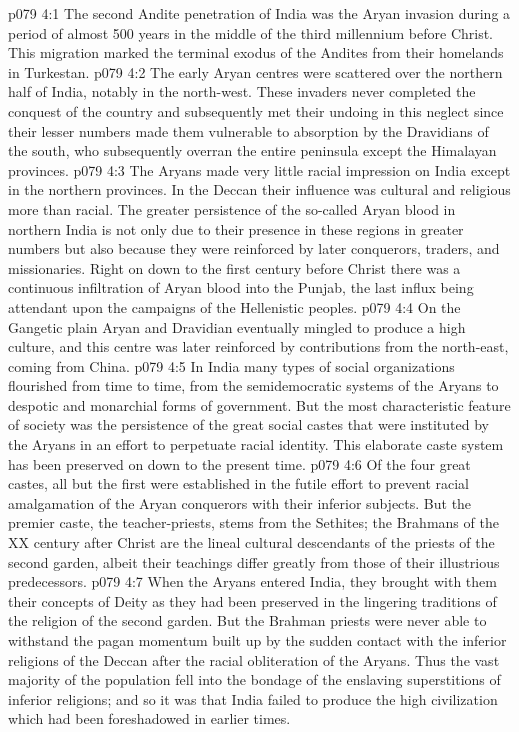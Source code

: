 \vs p079 4:1 The second Andite penetration of India was the Aryan invasion during a period of almost 500 years in the middle of the third millennium before Christ. This migration marked the terminal exodus of the Andites from their homelands in Turkestan.
\vs p079 4:2 The early Aryan centres were scattered over the northern half of India, notably in the north\hyp{}west. These invaders never completed the conquest of the country and subsequently met their undoing in this neglect since their lesser numbers made them vulnerable to absorption by the Dravidians of the south, who subsequently overran the entire peninsula except the Himalayan provinces.
\vs p079 4:3 The Aryans made very little racial impression on India except in the northern provinces. In the Deccan their influence was cultural and religious more than racial. The greater persistence of the so\hyp{}called Aryan blood in northern India is not only due to their presence in these regions in greater numbers but also because they were reinforced by later conquerors, traders, and missionaries. Right on down to the first century before Christ there was a continuous infiltration of Aryan blood into the Punjab, the last influx being attendant upon the campaigns of the Hellenistic peoples.
\vs p079 4:4 On the Gangetic plain Aryan and Dravidian eventually mingled to produce a high culture, and this centre was later reinforced by contributions from the north\hyp{}east, coming from China.
\vs p079 4:5 In India many types of social organizations flourished from time to time, from the semidemocratic systems of the Aryans to despotic and monarchial forms of government. But the most characteristic feature of society was the persistence of the great social castes that were instituted by the Aryans in an effort to perpetuate racial identity. This elaborate caste system has been preserved on down to the present time.
\vs p079 4:6 Of the four great castes, all but the first were established in the futile effort to prevent racial amalgamation of the Aryan conquerors with their inferior subjects. But the premier caste, the teacher\hyp{}priests, stems from the Sethites; the Brahmans of the XX century after Christ are the lineal cultural descendants of the priests of the second garden, albeit their teachings differ greatly from those of their illustrious predecessors.
\vs p079 4:7 When the Aryans entered India, they brought with them their concepts of Deity as they had been preserved in the lingering traditions of the religion of the second garden. But the Brahman priests were never able to withstand the pagan momentum built up by the sudden contact with the inferior religions of the Deccan after the racial obliteration of the Aryans. Thus the vast majority of the population fell into the bondage of the enslaving superstitions of inferior religions; and so it was that India failed to produce the high civilization which had been foreshadowed in earlier times.
